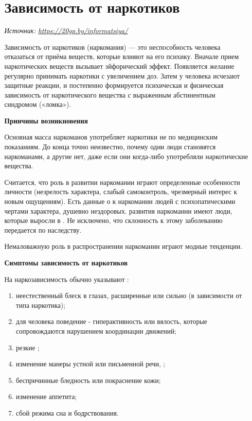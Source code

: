 
\section{Зависимость от наркотиков}

 {\it Источник: \url{https://20gp.by/informatsiya/}}

Зависимость от наркотиков (наркомания) --- это неспособность человека отказаться от приёма веществ, которые влияют на его психику. Вначале прием наркотических веществ вызывает эйфорический эффект. Появляется желание регулярно принимать наркотики с увеличением доз. Затем у человека исчезают защитные реакции, и постепенно формируется психическая и физическая зависимость от наркотического вещества с выраженным абстинентным синдромом («ломка»).

\textbf{Принчины возникновения}

Основная масса наркоманов употребляет наркотики не по медицинским показаниям. До конца точно неизвестно, почему одни люди становятся наркоманами, а другие нет, даже если они когда-либо употребляли наркотические вещества.

Считается, что роль в развитии наркомании играют определенные особенности личности (незрелость характера, слабый самоконтроль, чрезмерный интерес к новым ощущениям). Есть данные о  к наркомании людей с психопатическими чертами характера, душевно нездоровых.  развития наркомании имеют люди, которые выросли в . Не исключено, что склонность к этому заболеванию передается по наследству.

Немаловажную роль в распространении наркомании играют модные тенденции.

\textbf{Симптомы зависимость от наркотиков}

На наркозависимость обычно указывают :
\begin{enumerate}
    \item неестественный блеск в глазах, расширенные или сильно  (в зависимости от типа наркотика);
    \item {} для человека поведение  - гиперактивность или вялость, которые сопровождаются нарушением координации движений;
    \item резкие ;
    \item изменение манеры устной или письменной речи, ;
    \item беспричинные бледность или покраснение кожи;
    \item изменение аппетита;
    \item сбой режима сна и бодрствования.
\end{enumerate}

